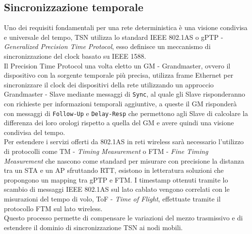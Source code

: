 \documentclass[12pt,a4paper,twoside]{book}
\begin{document}
\begin{onehalfspace}
\section{Sincronizzazione temporale}
Uno dei requisiti fondamentali per una rete deterministica è una visione condivisa e universale del tempo, TSN utilizza lo standard IEEE 802.1AS o gPTP - \textit{Generalized Precision Time Protocol}, esso definisce un meccanismo di sincronizzazione del clock basato su IEEE 1588.
\\
Il Precision Time Protocol una volta eletto un GM - Grandmaster, ovvero il dispositivo con la sorgente temporale più precisa, utilizza frame Ethernet per sincronizzare il clock dei dispositivi della rete utilizzando un approccio Grandmaster - Slave mediante messaggi di \texttt{Sync}, al quale gli Slave risponderanno con richieste per informazioni temporali aggiuntive, a queste il GM risponderà con messaggi di \texttt{Follow-Up} e \texttt{Delay-Resp} che permettono agli Slave di calcolare la differenza dei loro orologi rispetto a quella del GM e avere quindi una visione condivisa del tempo.
\\
Per estendere i servizi offerti da 802.1AS in reti wireless sarà necessario l'utilizzo di protocolli come TM - \textit{Timing Measurement}  o FTM - \textit{Fine Timing Measurement} che nascono come standard per misurare con precisione la distanza tra un STA e un AP sfruttando RTT, esistono in letteratura \cite{TSN_FTM} soluzioni che propongono un mapping tra gPTP e FTM. I timestamp ottenuti tramite lo scambio di messaggi IEEE 802.1AS sul lato cablato vengono correlati con le misurazioni del tempo di volo, ToF - \textit{Time of Flight}, effettuate tramite il protocollo FTM sul lato wireless.
\\
Questo processo permette di compensare le variazioni del mezzo trasmissivo e di estendere il dominio di sincronizzazione TSN ai nodi mobili.

\end{onehalfspace}
\end{document}
